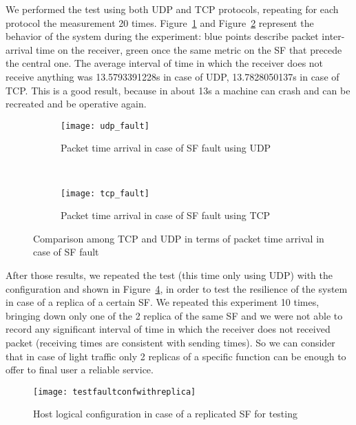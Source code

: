 We performed the test using both UDP and TCP protocols, repeating for each
protocol the measurement 20 times.
Figure~\ref{chap:tests:sec:fault:img:faultgraphudp} and
Figure~\ref{chap:tests:sec:fault:img:faultgraphtcp} represent the behavior of
the system during the experiment: blue points describe packet inter-arrival
time on the receiver, green once the same metric on the SF that precede the
central one. The average interval of time in which the
receiver does not receive anything was 13.5793391228s in case of UDP,
13.7828050137s in case of TCP. This is a good result, because in about 13s a
machine can crash and can be recreated and be operative again. 

\begin{figure}[]
    \begin{subfigure}[b]{0.9\textwidth}
        \texttt{[image: udp\_fault]}
        \caption{Packet time arrival in case of SF fault using UDP}
        \label{chap:tests:sec:fault:img:faultgraphudp}
    \end{subfigure}
    \\
    \begin{subfigure}[b]{0.9\textwidth}
        \texttt{[image: tcp\_fault]}
        \caption{Packet time arrival in case of SF fault using TCP}
        \label{chap:tests:sec:fault:img:faultgraphtcp}
    \end{subfigure}
    \caption{Comparison among TCP and UDP in terms of packet time arrival in
    case of SF fault}
    \label{chap:tests:sec:fault:img:faultgrapht}
\end{figure}

After those results, we repeated the test (this time only using UDP) with the
configuration and shown in
Figure~\ref{chap:tests:sec:fault:img:testfaultconfwithreplica}, in order to
test the resilience of the system in case of a replica of a certain SF. We
repeated this experiment 10 times, bringing down only one of the 2 replica of
the same SF and we were not able to record any significant interval of time in
which the receiver does not received packet (receiving times are consistent
with sending times). So we can consider that in case of light traffic only 2
replicas of a specific function can be enough to offer to final user a reliable
service.

\begin{figure}[H]
  \centering
  \texttt{[image: testfaultconfwithreplica]}
  \caption{Host logical configuration in case of a replicated SF for testing}
  \label{chap:tests:sec:fault:img:testfaultconfwithreplica}
\end{figure}
